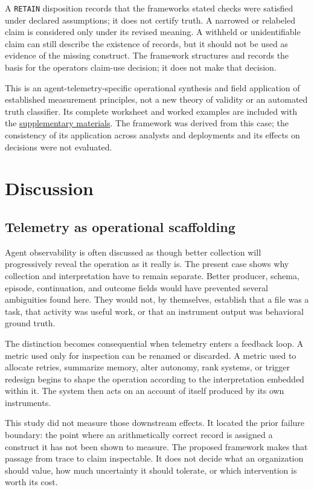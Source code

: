 \documentclass[12pt]{article}
\begin{document}
A \texttt{RETAIN} disposition records that the framework\textquotesingle s stated checks were satisfied under declared assumptions; it does not certify truth. A narrowed or relabeled claim is considered only under its revised meaning. A withheld or unidentifiable claim can still describe the existence of records, but it should not be used as evidence of the missing construct. The framework structures and records the basis for the operator\textquotesingle s claim-use decision; it does not make that decision.

This is an agent-telemetry-specific operational synthesis and field application of established measurement principles, not a new theory of validity or an automated truth classifier. Its complete worksheet and worked examples are included with the \href{https://doi.org/10.5281/zenodo.21652317}{supplementary materials}. The framework was derived from this case; the consistency of its application across analysts and deployments and its effects on decisions were not evaluated.

\section{Discussion}\label{discussion}

\subsection{Telemetry as operational scaffolding}\label{telemetry-as-operational-scaffolding}

Agent observability is often discussed as though better collection will progressively reveal the operation as it really is. The present case shows why collection and interpretation have to remain separate. Better producer, schema, episode, continuation, and outcome fields would have prevented several ambiguities found here. They would not, by themselves, establish that a file was a task, that activity was useful work, or that an instrument output was behavioral ground truth.

The distinction becomes consequential when telemetry enters a feedback loop. A metric used only for inspection can be renamed or discarded. A metric used to allocate retries, summarize memory, alter autonomy, rank systems, or trigger redesign begins to shape the operation according to the interpretation embedded within it. The system then acts on an account of itself produced by its own instruments.

This study did not measure those downstream effects. It located the prior failure boundary: the point where an arithmetically correct record is assigned a construct it has not been shown to measure. The proposed framework makes that passage from trace to claim inspectable. It does not decide what an organization should value, how much uncertainty it should tolerate, or which intervention is worth its cost.
\end{document}
